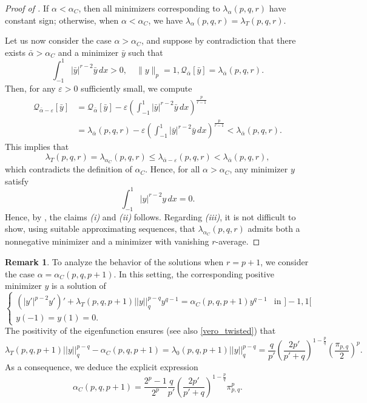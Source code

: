 \documentclass{amsart}
\theoremstyle{definition}
\newtheorem{rem}[thm]{Remark}
\theoremstyle{remark}
\newcommand{\eps}{\varepsilon}
\begin{document}
\begin{proof}[Proof of ]
If $\alpha<\alpha_{C}$, then all minimizers corresponding to $\lambda_\alpha(p,q,r)$ have constant sign; otherwise, when $\alpha<\alpha_{C}$, we have $\lambda_\alpha(p,q,r)=\lambda_T(p,q,r)$. 

Let us now consider the case $\alpha>\alpha_{C}$, and suppose by contradiction that there exists $\bar \alpha>\alpha_{C}$ and a minimizer $\bar y$ such that 
\[
\int_{-1}^{1}|\bar y|^{r-2}\bar y\,dx>0,\quad \|y\|_{p}=1, \mathcal Q_{\bar\alpha}[\bar y]=\lambda_{\bar\alpha}(p,q,r).\]
Then, for any $\varepsilon>0$ sufficiently small, we compute 
\begin{align*}
\mathcal Q_{\bar\alpha-\eps}[\bar y] &=
\mathcal Q_{\bar\alpha}[\bar y]-\eps\left(\int_{-1}^{1}|\bar y|^{r-2}\bar y\,dx\right)^{\frac p{r-1} }\\ &=\lambda_{\bar\alpha}(p,q,r)-\eps\left(\int_{-1}^{1}|\bar y|^{r-2}\bar y\,dx\right)^{\frac p{r-1}}<\lambda_{\bar\alpha}(p,q,r).
\end{align*}
This implies that  
\[
\lambda_{T}(p,q,r)=\lambda_{\alpha_{C}}(p,q,r)\le\lambda_{\bar\alpha-\eps}(p,q,r)<\lambda_{\bar\alpha}(p,q,r),\]
which contradicts the definition of $\alpha_C$. Hence, for all $\alpha>\alpha_C$, any minimizer $y$ satisfy
\[
\int_{-1}^{1}|y|^{r-2}y\,dx=0.
\]
 Hence, by , the claims {\it (i)} and {\it (ii)} follows. Regarding {\it (iii)}, it is not difficult to show, using suitable approximating sequences, that $\lambda_{\alpha_{C}}(p,q,r)$ admits both a nonnegative minimizer and a minimizer with vanishing $r$-average. 
\end{proof}

\begin{rem}%
To analyze the behavior of the solutions when $r=p+1$, we consider the case $\alpha=\alpha_C(p,q,p+1)$. In this setting, the corresponding positive minimizer $y$ is a solution of
\begin{equation*}
\left\{
\begin{array}{ll}
(|y'|^{p-2}y')'+\lambda_T(p,q,p+1)||y||_q^{p-q} y^{q-1}=\alpha_C(p,q,p+1) y^{q-1} &\text{in }]-1,1[\\
y(-1)=y(1)=0.
\end{array}
\right.
\end{equation*}
The positivity of the eigenfunction ensures (see also \eqref{vero_twisted}) that
\begin{equation*}
\lambda_T(p,q,p+1)||y||_q^{p-q}-\alpha_C(p,q,p+1)=\lambda_{0}(p,q,p+1)||y||_q^{p-q}=\frac {q}{p'}\left(\frac {2p'} {p'+q}\right)^{1-\frac pq}\left(\frac{ \pi_{p,q}}{2}\right)^p.
\end{equation*}
As a consequence, we deduce the explicit expression
\[
\alpha_{C}(p,q,p+1)=\frac{2^p-1}{2^p}\frac {q}{p'}\left(\frac {2p'} {p'+q}\right)^{1-\frac pq} \pi_{p,q}^p.\]
\end{rem}
\end{document}
